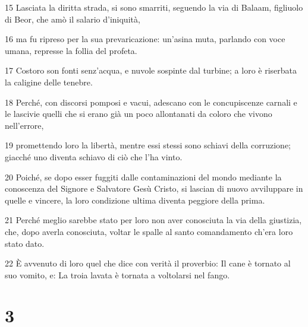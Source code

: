 \par 15 Lasciata la diritta strada, si sono smarriti, seguendo la via di Balaam, figliuolo di Beor, che amò il salario d'iniquità,
\par 16 ma fu ripreso per la sua prevaricazione: un'asina muta, parlando con voce umana, represse la follia del profeta.
\par 17 Costoro son fonti senz'acqua, e nuvole sospinte dal turbine; a loro è riserbata la caligine delle tenebre.
\par 18 Perché, con discorsi pomposi e vacui, adescano con le concupiscenze carnali e le lascivie quelli che si erano già un poco allontanati da coloro che vivono nell'errore,
\par 19 promettendo loro la libertà, mentre essi stessi sono schiavi della corruzione; giacché uno diventa schiavo di ciò che l'ha vinto.
\par 20 Poiché, se dopo esser fuggiti dalle contaminazioni del mondo mediante la conoscenza del Signore e Salvatore Gesù Cristo, si lascian di nuovo avviluppare in quelle e vincere, la loro condizione ultima diventa peggiore della prima.
\par 21 Perché meglio sarebbe stato per loro non aver conosciuta la via della giustizia, che, dopo averla conosciuta, voltar le spalle al santo comandamento ch'era loro stato dato.
\par 22 È avvenuto di loro quel che dice con verità il proverbio: Il cane è tornato al suo vomito, e: La troia lavata è tornata a voltolarsi nel fango.

\chapter{3}

